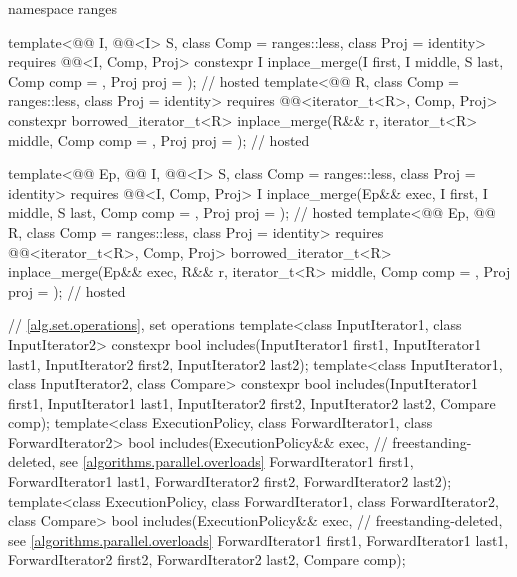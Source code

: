 \begin{codeblock}
{  namespace ranges {
    template<@@ I, @@<I> S, class Comp = ranges::less,
             class Proj = identity>
      requires @@<I, Comp, Proj>
      constexpr I
        inplace_merge(I first, I middle, S last, Comp comp = {}, Proj proj = {});       // hosted
    template<@@ R, class Comp = ranges::less, class Proj = identity>
      requires @@<iterator_t<R>, Comp, Proj>
      constexpr borrowed_iterator_t<R>
        inplace_merge(R&& r, iterator_t<R> middle, Comp comp = {}, Proj proj = {});     // hosted

    template<@@ Ep, @@ I, @@<I> S,
             class Comp = ranges::less, class Proj = identity>
      requires @@<I, Comp, Proj>
      I inplace_merge(Ep&& exec, I first, I middle, S last, Comp comp = {},
                      Proj proj = {});                          // hosted
    template<@@ Ep, @@ R, class Comp = ranges::less,
             class Proj = identity>
      requires @@<iterator_t<R>, Comp, Proj>
      borrowed_iterator_t<R>
        inplace_merge(Ep&& exec, R&& r, iterator_t<R> middle, Comp comp = {},
                      Proj proj = {});                          // hosted
  }

  // \ref{alg.set.operations}, set operations
  template<class InputIterator1, class InputIterator2>
    constexpr bool includes(InputIterator1 first1, InputIterator1 last1,
                            InputIterator2 first2, InputIterator2 last2);
  template<class InputIterator1, class InputIterator2, class Compare>
    constexpr bool includes(InputIterator1 first1, InputIterator1 last1,
                            InputIterator2 first2, InputIterator2 last2,
                            Compare comp);
  template<class ExecutionPolicy, class ForwardIterator1, class ForwardIterator2>
    bool includes(ExecutionPolicy&& exec,                       // freestanding-deleted, see \ref{algorithms.parallel.overloads}
                  ForwardIterator1 first1, ForwardIterator1 last1,
                  ForwardIterator2 first2, ForwardIterator2 last2);
  template<class ExecutionPolicy, class ForwardIterator1, class ForwardIterator2,
           class Compare>
    bool includes(ExecutionPolicy&& exec,                       // freestanding-deleted, see \ref{algorithms.parallel.overloads}
                  ForwardIterator1 first1, ForwardIterator1 last1,
                  ForwardIterator2 first2, ForwardIterator2 last2,
                  Compare comp);

}
\end{codeblock}
